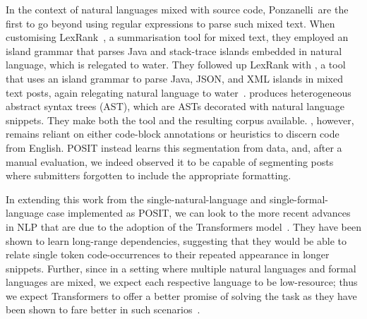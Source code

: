 In the context of natural languages mixed with source code, Ponzanelli~\etal are
the first to go beyond using regular expressions to parse such mixed text. When
customising LexRank~\cite{Ponzanelli2015b}, a summarisation tool for mixed text,
they employed an island grammar that parses Java and stack-trace islands
embedded in natural language, which is relegated to water. They followed up
LexRank with \stormed, a tool that uses an island grammar to parse Java, JSON,
and XML islands in mixed text \SO posts, again relegating natural language to
water~\cite{Ponzanelli2015a}.  \stormed produces heterogeneous abstract syntax
trees (AST), which are ASTs decorated with natural language snippets. They make
both the tool and the resulting corpus available. \stormed, however, remains
reliant on either code-block annotations or heuristics to discern code from
English. POSIT instead learns this segmentation from data, and, after a manual
evaluation, we indeed observed it to be capable of segmenting \SO posts where
submitters forgotten to include the appropriate formatting.

In extending this work from the single-natural-language and
single-formal-language case implemented as POSIT, we can look to the more recent
advances in NLP that are due to the adoption of the Transformers
model~\cite{vaswani2017attention, wang2019language}. They have been shown to
learn long-range dependencies, suggesting that they would be able to relate
single token code-occurrences to their repeated appearance in longer snippets.
Further, since in a setting where multiple natural languages and formal
languages are mixed, we expect each respective language to be low-resource; thus
we expect Transformers to offer a better promise of solving the task as they
have been shown to fare better in such scenarios~\cite{lakew2017multilingual}.